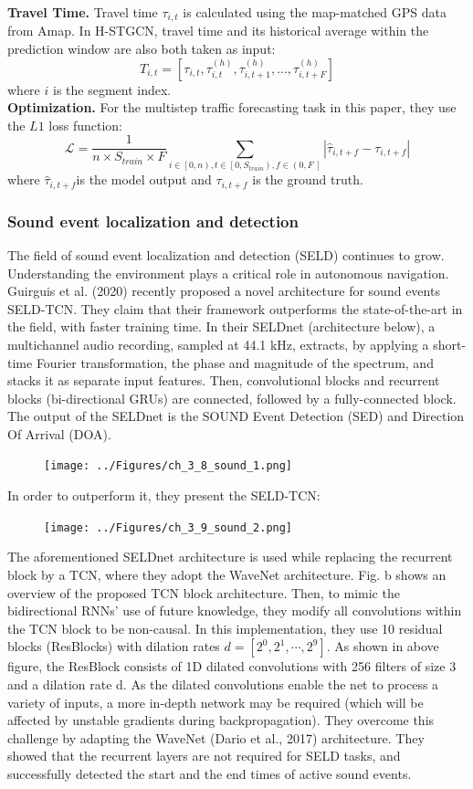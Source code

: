 \textbf{Travel Time.} Travel time $\tau_{i,t}$ is calculated using the map-matched GPS data from Amap. In H-STGCN, travel time and its historical average within the prediction window are also both taken as input:
$$T_{i,t}=\left[\tau_{i,t},\tau_{i,t}^{\left(h\right)},\tau_{i,t+1}^{\left(h\right)},\ldots,\tau_{i,t+F}^{\left(h\right)}\right]$$
where $i$ is the segment index. \\
 \textbf{Optimization.} For the multistep traffic forecasting task in this paper, they use the $L1 $ loss function:
$$\mathcal{L}=\frac{1}{n\times S_{train}\times F}\sum_{i\in\left[0,n\right),t\in\left[0,S_{train}\right),f\in\left(0,F\ \right]}\left|{\hat{\tau}}_{i,t+f}-\tau_{i,t+f}\right|$$
where ${\hat{\tau}}_{i,t+f}$is the model output and $\tau_{i,t+f}$ is the ground truth.
\subsubsection{Sound event localization and detection}
The field of sound event localization and detection (SELD) continues to grow. Understanding the environment plays a critical role in autonomous navigation. Guirguis et al. (2020) recently proposed a novel architecture for sound events SELD-TCN. They claim that their framework outperforms the state-of-the-art in the field, with faster training time. In their SELDnet (architecture below), a multichannel audio recording, sampled at 44.1 kHz, extracts, by applying a short-time Fourier transformation, the phase and magnitude of the spectrum, and stacks it as separate input features. Then, convolutional blocks and recurrent blocks (bi-directional GRUs) are connected, followed by a fully-connected block. The output of the SELDnet is the SOUND Event Detection (SED) and Direction Of Arrival (DOA).
\begin{figure}[H]
    \texttt{[image: ../Figures/ch\_3\_8\_sound\_1.png]}
\end{figure}
 In order to outperform it, they present the SELD-TCN:
\begin{figure}[H]
    \texttt{[image: ../Figures/ch\_3\_9\_sound\_2.png]}
\end{figure}
The aforementioned SELDnet architecture is used while replacing the recurrent block by a TCN, where they adopt the WaveNet architecture. Fig. b shows an overview of the proposed TCN block architecture. Then, to mimic the bidirectional RNNs’ use of future
knowledge, they modify all convolutions within the TCN block to be non-causal. In this implementation, they use 10 residual blocks (ResBlocks) with dilation rates $d = \left[2^0,2^1,\cdots,2^9\right]$. As shown in above figure, the ResBlock consists of 1D dilated convolutions with 256 filters of size 3 and a dilation rate d.
As the dilated convolutions enable the net to process a variety of inputs, a more in-depth network may be required (which will be affected by unstable gradients during backpropagation). They overcome this challenge by adapting the WaveNet (Dario et al., 2017) architecture. They showed that the recurrent layers are not required for SELD tasks, and successfully detected the start and the end times of active sound events.

